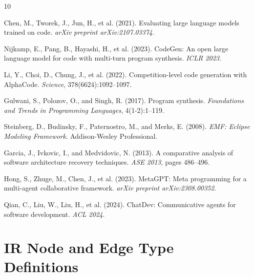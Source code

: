 \documentclass[11pt,a4paper]{article}
\begin{document}

\begin{thebibliography}{10}

Chen, M., Tworek, J., Jun, H., et al. (2021).
\newblock Evaluating large language models trained on code.
\newblock \emph{arXiv preprint arXiv:2107.03374}.

Nijkamp, E., Pang, B., Hayashi, H., et al. (2023).
\newblock CodeGen: An open large language model for code with multi-turn program synthesis.
\newblock \emph{ICLR 2023}.

Li, Y., Choi, D., Chung, J., et al. (2022).
\newblock Competition-level code generation with AlphaCode.
\newblock \emph{Science}, 378(6624):1092--1097.

Gulwani, S., Polozov, O., and Singh, R. (2017).
\newblock Program synthesis.
\newblock \emph{Foundations and Trends in Programming Languages}, 4(1-2):1--119.

Steinberg, D., Budinsky, F., Paternostro, M., and Merks, E. (2008).
\newblock \emph{EMF: Eclipse Modeling Framework}.
\newblock Addison-Wesley Professional.

Garcia, J., Ivkovic, I., and Medvidovic, N. (2013).
\newblock A comparative analysis of software architecture recovery techniques.
\newblock \emph{ASE 2013}, pages 486--496.

Hong, S., Zhuge, M., Chen, J., et al. (2023).
\newblock MetaGPT: Meta programming for a multi-agent collaborative framework.
\newblock \emph{arXiv preprint arXiv:2308.00352}.

Qian, C., Liu, W., Liu, H., et al. (2024).
\newblock ChatDev: Communicative agents for software development.
\newblock \emph{ACL 2024}.

\end{thebibliography}

\appendix

\section{IR Node and Edge Type Definitions}
\end{document}
